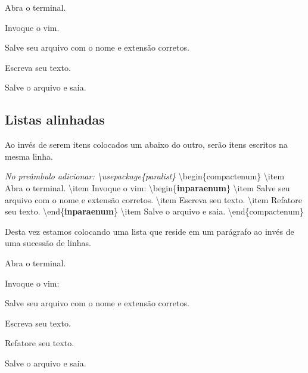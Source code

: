 \begin{compactenum}
\item Abra o terminal.
\item Invoque o vim.
\begin{compactitem}
\item Salve seu arquivo com o nome e extensão corretos.
\item Escreva seu texto.
\end{compactitem}
\item Salve o arquivo e saia.
\end{compactenum}

\subsection{Listas alinhadas}
Ao invés de serem itens colocados um abaixo do outro, serão itens escritos na
mesma linha.

\noindent \emph{No preâmbulo adicionar:\newline
\noindent\textbackslash usepackage\{paralist\}\newline}
\textbackslash begin\{compactenum\}\newline
\textbackslash item Abra o terminal.\newline
\textbackslash item Invoque o vim:\newline
\textbackslash begin\{\textbf{inparaenum}\}\newline
\textbackslash item Salve seu arquivo com o nome e extensão corretos.\newline
\textbackslash item Escreva seu texto.\newline
\textbackslash item Refatore seu texto.\newline
\textbackslash end\{\textbf{inparaenum}\}\newline
\textbackslash item Salve o arquivo e saia.\newline
\textbackslash end\{compactenum\}\newline

Desta vez estamos colocando uma lista que reside em um parágrafo ao invés de uma sucessão de linhas.

\begin{compactenum}
\item Abra o terminal.
\item Invoque o vim:
\begin{inparaenum}
\item Salve seu arquivo com o nome e extensão corretos.
\item Escreva seu texto.
\item Refatore seu texto.
\end{inparaenum}
\item Salve o arquivo e saia.
\end{compactenum}

